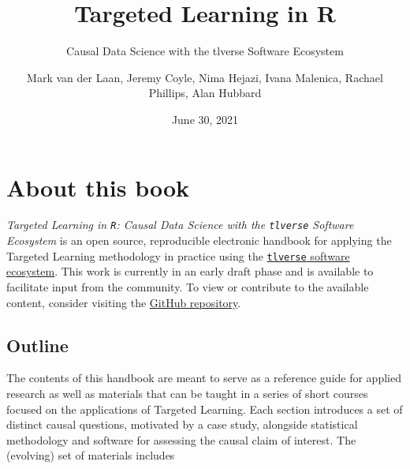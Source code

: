 \documentclass[12pt, krantz2,]{krantz}
\title{Targeted Learning in R}
\subtitle{Causal Data Science with the tlverse Software Ecosystem}
\author{Mark van der Laan, Jeremy Coyle, Nima Hejazi, Ivana Malenica, Rachael Phillips, Alan Hubbard}
\date{June 30, 2021}
\newcommand{\passthrough}[1]{#1}
\theoremstyle{definition}
\theoremstyle{definition}
\theoremstyle{definition}
\newcommand{\1}{\mathbbm{1}}
\begin{document}
\maketitle


\thispagestyle{empty}

\begin{center}
\end{center}

\setlength{\abovedisplayskip}{-5pt}
\setlength{\abovedisplayshortskip}{-5pt}

\mainmatter

{
\hypersetup{linkcolor=}
\setcounter{tocdepth}{2}
\tableofcontents
}
\hypertarget{about-this-book}{%
\chapter*{About this book}\label{about-this-book}}


\emph{Targeted Learning in \passthrough{\lstinline!R!}: Causal Data Science with the \passthrough{\lstinline!tlverse!} Software
Ecosystem} is an open source, reproducible electronic handbook for applying the
Targeted Learning methodology in practice using the \href{https://github.com/tlverse}{\passthrough{\lstinline!tlverse!} software
ecosystem}. This work is currently in an early draft
phase and is available to facilitate input from the community. To view or
contribute to the available content, consider visiting the \href{https://github.com/tlverse/tlverse-handbook}{GitHub
repository}.

\hypertarget{outline}{%
\section{Outline}\label{outline}}

The contents of this handbook are meant to serve as a reference guide for
applied research as well as materials that can be taught in a series of short
courses focused on the applications of Targeted Learning. Each section
introduces a set of distinct causal questions, motivated by a case study,
alongside statistical methodology and software for assessing the causal claim of
interest. The (evolving) set of materials includes
\end{document}
